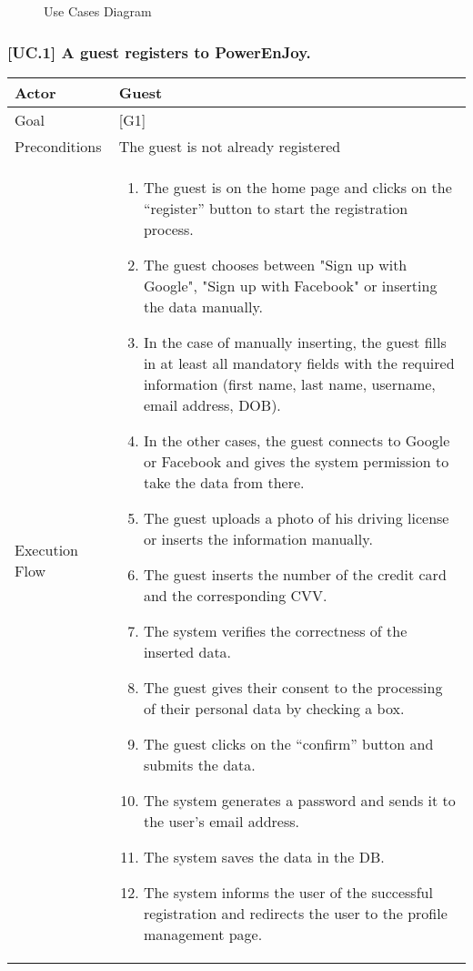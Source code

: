 \documentclass[english]{article}
\begin{document}
	\begin{figure}
		\centering
		\makebox[\textwidth][c]{
			\def\svgwidth{500pt}
			
		}
		\caption{Use Cases Diagram}
	\end{figure}

	\subsubsection{[UC.1] A guest registers to PowerEnJoy.}
	\begin{tabularx}{\textwidth}{  l  X  }
		\hline
		Actor & Guest\\
		\hline
		Goal & [G1]\\
		\hline
		Preconditions & The guest is not already registered\\
		\hline
		Execution Flow & \begin{enumerate}
			\item{The guest is on the home page and clicks on the “register” button to start the registration process.}
			\item{The guest chooses between "Sign up with Google", "Sign up with Facebook" or inserting the data manually.}
			\item{In the case of manually inserting, the guest fills in at least all mandatory fields with the required information (first name, last name, username, email address, DOB).}
			\item{In the other cases, the guest connects to Google or Facebook and gives the system permission to take the data from there.}
			\item{The guest uploads a photo of his driving license or inserts the information manually.}
			\item{The guest inserts the number of the credit card and the corresponding CVV}.
			\item{The system verifies the correctness of the inserted data.}
			\item{The guest gives their consent to the processing of their personal data by checking a box.}
			\item{The guest clicks on the “confirm” button and submits the data.}
			\item{The system generates a password and sends it to the user's email address.}
			\item{The system  saves the data in the DB.}
			\item{The system informs the user of the successful registration and redirects the user to the profile management page.}
		\end{enumerate}\\
		\hline
	\end{tabularx}
\end{document}
